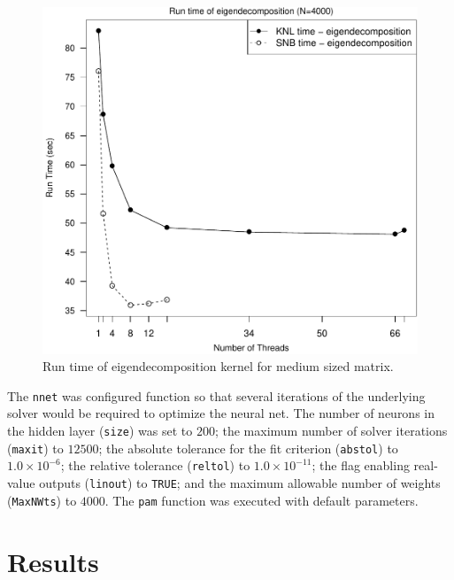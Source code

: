 \begin{figure}
\includegraphics[height=\columnwidth, width=\columnwidth]{eigen_4000_68-rt.pdf}
\caption{Run time of eigendecomposition kernel for medium sized matrix.}
\label{fig:mediumEigenTime}
\end{figure}

The \texttt{nnet} was configured function so that several iterations of the underlying
solver would be required to optimize the neural net. The number of neurons in the hidden
layer (\texttt{size}) was set to $200$; the maximum number of solver iterations
(\texttt{maxit}) to $12500$; the absolute tolerance for the fit criterion
(\texttt{abstol}) to $1.0\times 10^{-6}$; the relative tolerance (\texttt{reltol}) to
$1.0\times 10^{-11}$; the flag enabling real-value outputs (\texttt{linout}) to
\texttt{TRUE}; and the maximum allowable number of weights (\texttt{MaxNWts}) to $4000$.
The \texttt{pam} function was executed with default parameters.

\section{Results} \label{sec:results}

